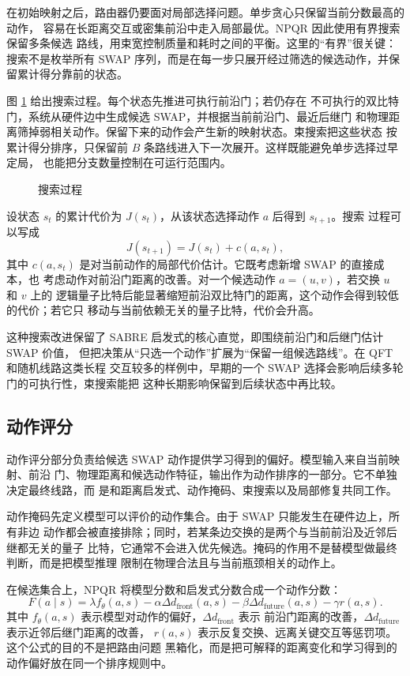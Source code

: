 在初始映射之后，路由器仍要面对局部选择问题。单步贪心只保留当前分数最高的动作，
容易在长距离交互或密集前沿中走入局部最优。NPQR 因此使用有界搜索保留多条候选
路线，用束宽控制质量和耗时之间的平衡。这里的“有界”很关键：搜索不是枚举所有
SWAP 序列，而是在每一步只展开经过筛选的候选动作，并保留累计得分靠前的状态。

图 \ref{fig:search-process} 给出搜索过程。每个状态先推进可执行前沿门；若仍存在
不可执行的双比特门，系统从硬件边中生成候选 SWAP，并根据当前前沿门、最近后继门
和物理距离筛掉弱相关动作。保留下来的动作会产生新的映射状态。束搜索把这些状态
按累计得分排序，只保留前 $B$ 条路线进入下一次展开。这样既能避免单步选择过早定局，
也能把分支数量控制在可运行范围内。

\begin{figure}[H]
  \centering
  
  \caption{搜索过程}
  \label{fig:search-process}
\end{figure}

设状态 $s_t$ 的累计代价为 $J(s_t)$，从该状态选择动作 $a$ 后得到 $s_{t+1}$。搜索
过程可以写成
\[
  J(s_{t+1}) = J(s_t) + c(a,s_t),
\]
其中 $c(a,s_t)$ 是对当前动作的局部代价估计。它既考虑新增 SWAP 的直接成本，也
考虑动作对前沿门距离的改善。对一个候选动作 $a=(u,v)$，若交换 $u$ 和 $v$ 上的
逻辑量子比特后能显著缩短前沿双比特门的距离，这个动作会得到较低的代价；若它只
移动与当前依赖无关的量子比特，代价会升高。

这种搜索改进保留了 SABRE 启发式的核心直觉，即围绕前沿门和后继门估计 SWAP 价值，
但把决策从“只选一个动作”扩展为“保留一组候选路线”。在 QFT 和随机线路这类长程
交互较多的样例中，早期的一个 SWAP 选择会影响后续多轮门的可执行性，束搜索能把
这种长期影响保留到后续状态中再比较。

\subsection{动作评分}

动作评分部分负责给候选 SWAP 动作提供学习得到的偏好。模型输入来自当前映射、前沿
门、物理距离和候选动作特征，输出作为动作排序的一部分。它不单独决定最终线路，而
是和距离启发式、动作掩码、束搜索以及局部修复共同工作。

动作掩码先定义模型可以评价的动作集合。由于 SWAP 只能发生在硬件边上，所有非边
动作都会被直接排除；同时，若某条边交换的是两个与当前前沿及近邻后继都无关的量子
比特，它通常不会进入优先候选。掩码的作用不是替模型做最终判断，而是把模型推理
限制在物理合法且与当前瓶颈相关的动作上。

在候选集合上，NPQR 将模型分数和启发式分数合成一个动作分数：
\[
  F(a\mid s)=\lambda f_{\theta}(a,s)
  - \alpha \Delta d_{\mathrm{front}}(a,s)
  - \beta \Delta d_{\mathrm{future}}(a,s)
  - \gamma r(a,s).
\]
其中 $f_{\theta}(a,s)$ 表示模型对动作的偏好，$\Delta d_{\mathrm{front}}$ 表示
前沿门距离的改善，$\Delta d_{\mathrm{future}}$ 表示近邻后继门距离的改善，
$r(a,s)$ 表示反复交换、远离关键交互等惩罚项。这个公式的目的不是把路由问题
黑箱化，而是把可解释的距离变化和学习得到的动作偏好放在同一个排序规则中。

